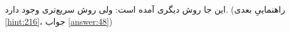 \section{}
\paragraph{}\label{hint:140}
این جا روش دیگری آمده است:
\LTR\noindent
{}
\RTL
ولی روش سریع‌تری وجود دارد. (راهنماییِ بعدی \ref{hint:216}، جواب \ref{answer:48})
